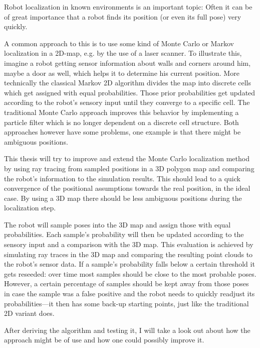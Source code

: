 \documentclass[Thesis.tex]{subfiles}
\begin{document}
Robot localization in known environments is an important topic: Often it can be of great importance that a robot finds its position (or even its full pose) very quickly.

A common approach to this is to use some kind of Monte Carlo or Markov localization in a 2D-map, e.g. by the use of a laser scanner. To illustrate this, imagine a robot getting sensor information about walls and corners around him, maybe a door as well, which helps it to determine his current position. More technically the classical Markov 2D algorithm divides the map into discrete cells which get assigned with equal probabilities. Those prior probabilities get updated according to the robot's sensory input until they converge to a specific cell. The traditional Monte Carlo approach improves this behavior by implementing a particle filter which is no longer dependent on a discrete cell structure. Both approaches however have some problems, one example is that there might be ambiguous positions.

\bigskip

This thesis will try to improve and extend the Monte Carlo localization method by using ray tracing from sampled positions in a 3D polygon map and comparing the robot's information to the simulation results. This should lead to a quick convergence of the positional assumptions towards the real position, in the ideal case. By using a 3D map there should be less ambiguous positions during the localization step.

\bigskip

The robot will sample poses into the 3D map and assign those with equal probabilities. Each sample's probability will then be updated according to the sensory input and a comparison with the 3D map. This evaluation is achieved by simulating ray traces in the 3D map and comparing the resulting point clouds to the robot's sensor data. If a sample's probability falls below a certain threshold it gets reseeded: over time most samples should be close to the most probable poses. However, a certain percentage of samples should be kept away from those poses in case the sample was a false positive and the robot needs to quickly readjust its probabilities---it then has some back-up starting points, just like the traditional 2D variant does. 

\bigskip

After deriving the algorithm and testing it, I will take a look out about how the approach might be of use and how one could possibly improve it.
\end{document}
